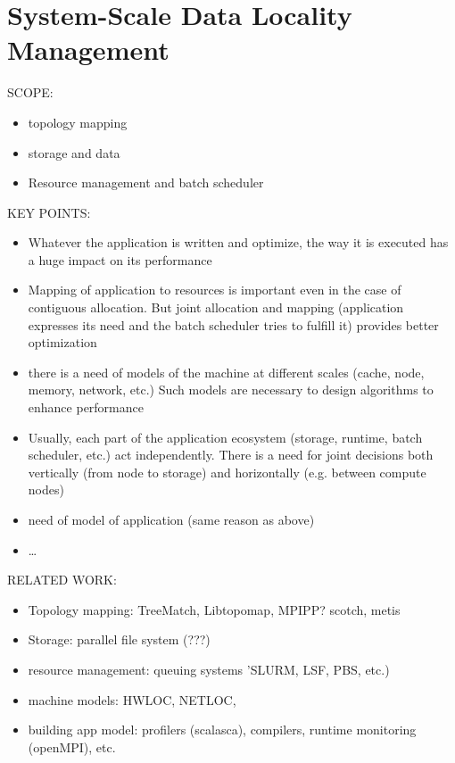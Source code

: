 \chapter{System-Scale Data Locality Management}
\label{ch:systemscale}







SCOPE:

\begin{itemize}
\item topology mapping
\item storage and data
\item Resource management and batch scheduler
\end{itemize}

KEY POINTS:
\begin{itemize}
\item Whatever the application is written and optimize, the way it is executed
  has a huge impact on its performance
 \item Mapping of application to resources is important even in the case of
   contiguous allocation. But joint allocation and mapping  (application
   expresses its need and the batch scheduler tries to fulfill it) provides
   better optimization
\item there is a need of models of the machine at different scales (cache, node,
memory, network, etc.) Such models are necessary to design algorithms to enhance
performance
  \item Usually, each part of the application ecosystem (storage, runtime, batch
    scheduler, etc.) act independently. There is a need for joint decisions both
    vertically (from node to storage) and horizontally (e.g. between compute
    nodes)
\item need of model of application (same reason as above)
\item \ldots
\end{itemize}

RELATED WORK: 

\begin{itemize}
\item Topology mapping: TreeMatch, Libtopomap, MPIPP? scotch, metis  
\item Storage: parallel file system (???)
\item resource management: queuing systems 'SLURM, LSF, PBS, etc.)
\item machine models: HWLOC, NETLOC, 
\item building app model: profilers (scalasca), compilers, runtime monitoring (openMPI), etc. 
\end{itemize}

